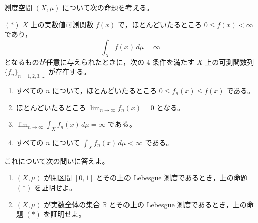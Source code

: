 \documentclass[12pt]{jlreq}
\newcommand{\R}{\mathbb{R}}
\begin{document}
測度空間 \((X,\mu)\) について次の命題を考える。

\((*)\) \(X\) 上の実数値可測関数 \(f(x)\) で，ほとんどいたるところ \(0\le f(x)<\infty\) であり，
\[
  \int_X f(x)\,d\mu=\infty
\]
となるものが任意に与えられたときに，次の \(4\) 条件を満たす \(X\) 上の可測関数列
\(\{f_n\}_{n=1,2,3,\ldots}\) が存在する。

\begin{enumerate}
  \item[(a)] すべての \(n\) について，ほとんどいたるところ \(0\le f_n(x)\le f(x)\) である。
  \item[(b)] ほとんどいたるところ \(\lim_{n\to\infty}f_n(x)=0\) となる。
  \item[(c)] \(\displaystyle \lim_{n\to\infty}\int_X f_n(x)\,d\mu=\infty\) である。
  \item[(d)] すべての \(n\) について \(\displaystyle \int_X f_n(x)\,d\mu<\infty\) である。
\end{enumerate}

これについて次の問いに答えよ。

\begin{enumerate}
  \item \((X,\mu)\) が閉区間 \([0,1]\) とその上の Lebesgue 測度であるとき，上の命題 \((*)\) を証明せよ。
  \item \((X,\mu)\) が実数全体の集合 \(\R\) とその上の Lebesgue 測度であるとき，上の命題 \((*)\) を証明せよ。
\end{enumerate}
\end{document}
